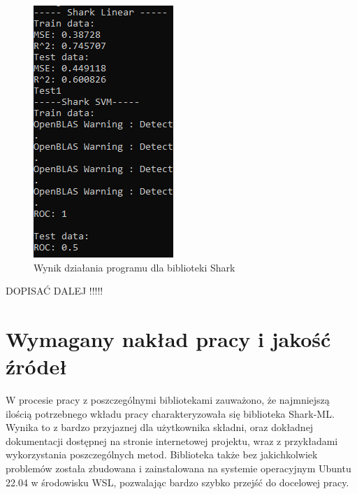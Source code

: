 \begin{figure}[!ht]
\begin{minipage}{0.32\textwidth}
		\includegraphics[width=0.7\linewidth]{Rozdzial7/shark}
		\caption{Wynik działania programu dla biblioteki Shark}
		\label{fig:shark_linear_svm}		
	\end{minipage}
\end{figure}

DOPISAĆ DALEJ !!!!!

\begin{figure}[!ht]
	
\end{figure}


\section{Wymagany nakład pracy i jakość źródeł}

W procesie pracy z poszczególnymi bibliotekami zauważono, że najmniejszą ilością potrzebnego wkładu pracy charakteryzowała się biblioteka Shark-ML. Wynika to z bardzo przyjaznej dla użytkownika składni, oraz dokładnej dokumentacji dostępnej na stronie internetowej projektu, wraz z przykładami wykorzystania poszczególnych metod. Biblioteka także bez jakichkolwiek problemów została zbudowana i zainstalowana na systemie operacyjnym Ubuntu 22.04 w środowisku WSL, pozwalając bardzo szybko przejść do docelowej pracy.

